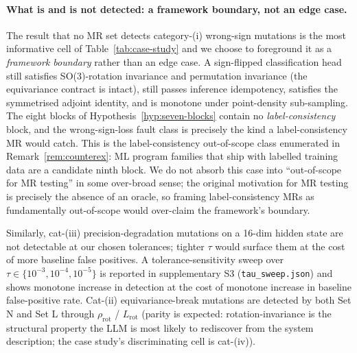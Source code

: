 \documentclass[acmsmall, screen]{acmart}
\begin{document}
\paragraph{What is and is not detected: a framework boundary, not an edge case.}
The result that no MR set detects category-(i) wrong-sign mutations is the most informative cell of Table~\ref{tab:case-study} and we choose to foreground it as a \emph{framework boundary} rather than an edge case. A sign-flipped classification head still satisfies SO(3)-rotation invariance and permutation invariance (the equivariance contract is intact), still passes inference idempotency, satisfies the symmetrised adjoint identity, and is monotone under point-density sub-sampling. The eight blocks of Hypothesis~\ref{hyp:seven-blocks} contain no \emph{label-consistency} block, and the wrong-sign-loss fault class is precisely the kind a label-consistency MR would catch. This is the label-consistency out-of-scope class enumerated in Remark~\ref{rem:counterex}: ML program families that ship with labelled training data are a candidate ninth block. We do not absorb this case into ``out-of-scope for MR testing'' in some over-broad sense; the original motivation for MR testing is precisely the absence of an oracle, so framing label-consistency MRs as fundamentally out-of-scope would over-claim the framework's boundary.

Similarly, cat-(iii) precision-degradation mutations on a 16-dim hidden state are not detectable at our chosen tolerances; tighter $\tau$ would surface them at the cost of more baseline false positives. A tolerance-sensitivity sweep over $\tau \in \{10^{-3}, 10^{-4}, 10^{-5}\}$ is reported in supplementary S3 (\texttt{tau\_sweep.json}) and shows monotone increase in detection at the cost of monotone increase in baseline false-positive rate. Cat-(ii) equivariance-break mutations are detected by both Set N and Set L through $\rho_{\mathrm{rot}}$ / $L_{\mathrm{rot}}$ (parity is expected: rotation-invariance is the structural property the LLM is most likely to rediscover from the system description; the case study's discriminating cell is cat-(iv)).
\end{document}
